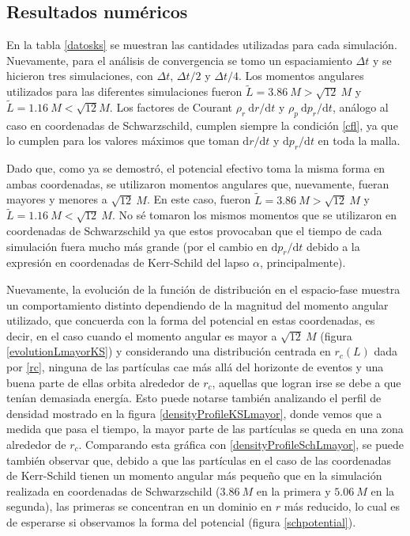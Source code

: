 \documentclass[11pt,twoside,openright,spanish]{report}
\numberwithin{equation}{chapter}
\numberwithin{figure}{chapter}
\numberwithin{table}{chapter}
\begin{document}
\subsection{Resultados numéricos}
\noindent
En la tabla \ref{datosks} se muestran las cantidades utilizadas para cada simulación. Nuevamente, para el análisis de convergencia se tomo un espaciamiento $\Delta t$ y se hicieron tres simulaciones, con $\Delta t$, $\Delta t/2$ y $\Delta t/4$. Los momentos angulares utilizados para las diferentes simulaciones fueron $\tilde{L}=3.86\ M>\sqrt{12}\ M$ y $\tilde{L}=1.16\ M<\sqrt{12}M$. Los factores de Courant $\rho_r\ \text{d}r/\text{d}t$ y $\rho_p\ \text{d}p_r/\text{d}t$, análogo al caso en coordenadas de Schwarzschild, cumplen siempre la condición \eqref{cfl}, ya que lo cumplen para los valores máximos que toman $\text{d}r/\text{d}t$ y $\text{d}p_r/\text{d}t$ en toda la malla. 

Dado que, como ya se demostró, el potencial efectivo toma la misma forma en ambas coordenadas, se utilizaron momentos angulares que, nuevamente, fueran mayores y menores a $\sqrt{12}\ M$. En este caso, fueron $\tilde{L}=3.86\ M>\sqrt{12}\ M$ y $\tilde{L}=1.16\ M<\sqrt{12}\ M$. No sé tomaron los mismos momentos que se utilizaron en coordenadas de Schwarzschild ya que estos provocaban que el tiempo de cada simulación fuera mucho más grande (por el cambio en $\text{d}p_r/\text{d}t$ debido a la expresión en coordenadas de Kerr-Schild del lapso $\alpha$, principalmente).

Nuevamente, la evolución de la función de distribución en el espacio-fase muestra un comportamiento distinto dependiendo de la magnitud del momento angular utilizado, que concuerda con la forma del potencial en estas coordenadas, es decir, en el caso cuando el momento angular es mayor a $\sqrt{12}\ M$ (figura \ref{evolutionLmayorKS}) y considerando una distribución centrada en $r_c(L)$ dada por \eqref{rc}, ninguna de las partículas cae más allá del horizonte de eventos y una buena parte de ellas orbita alrededor de $r_c$, aquellas que logran irse se debe a que tenían demasiada energía. Esto puede notarse también analizando el perfil de densidad mostrado en la figura \ref{densityProfileKSLmayor}, donde vemos que a medida que pasa el tiempo, la mayor parte de las partículas se queda en una zona alrededor de $r_c$. Comparando esta gráfica con \ref{densityProfileSchLmayor}, se puede también observar que, debido a que las partículas en el caso de las coordenadas de Kerr-Schild tienen un momento angular más pequeño que en la simulación realizada en coordenadas de Schwarzschild ($3.86\ M$ en la primera y $5.06\ M$ en la segunda), las primeras se concentran en un dominio en $r$ más reducido, lo cual es de esperarse si observamos la forma del potencial (figura \ref{schpotential}).
\end{document}
